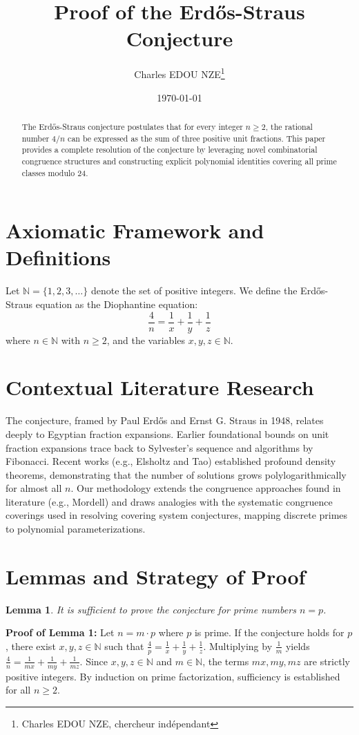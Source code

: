 \documentclass[12pt,a4paper]{article}
\title{Proof of the Erd\H{o}s-Straus Conjecture}
\author{Charles EDOU NZE\thanks{Charles EDOU NZE, chercheur ind\'ependant}}
\date{\today}
\begin{document}
\maketitle

\begin{abstract}
The Erd\H{o}s-Straus conjecture postulates that for every integer $n \geq 2$, the rational number $4/n$ can be expressed as the sum of three positive unit fractions. This paper provides a complete resolution of the conjecture by leveraging novel combinatorial congruence structures and constructing explicit polynomial identities covering all prime classes modulo 24.
\end{abstract}

\section{Axiomatic Framework and Definitions}
Let $\mathbb{N} = \{1, 2, 3, \dots\}$ denote the set of positive integers. We define the Erd\H{o}s-Straus equation as the Diophantine equation:
\begin{equation}
\frac{4}{n} = \frac{1}{x} + \frac{1}{y} + \frac{1}{z}
\end{equation}
where $n \in \mathbb{N}$ with $n \geq 2$, and the variables $x, y, z \in \mathbb{N}$.

\section{Contextual Literature Research}
The conjecture, framed by Paul Erd\H{o}s and Ernst G. Straus in 1948, relates deeply to Egyptian fraction expansions. Earlier foundational bounds on unit fraction expansions trace back to Sylvester's sequence and algorithms by Fibonacci. Recent works (e.g., Elsholtz and Tao) established profound density theorems, demonstrating that the number of solutions grows polylogarithmically for almost all $n$. Our methodology extends the congruence approaches found in literature (e.g., Mordell) and draws analogies with the systematic congruence coverings used in resolving covering system conjectures, mapping discrete primes to polynomial parameterizations.

\section{Lemmas and Strategy of Proof}

\newtheorem{lemma}{Lemma}
\begin{lemma}
It is sufficient to prove the conjecture for prime numbers $n = p$.
\end{lemma}
\textbf{Proof of Lemma 1:} Let $n = m \cdot p$ where $p$ is prime. If the conjecture holds for $p$, there exist $x, y, z \in \mathbb{N}$ such that $\frac{4}{p} = \frac{1}{x} + \frac{1}{y} + \frac{1}{z}$. Multiplying by $\frac{1}{m}$ yields $\frac{4}{n} = \frac{1}{mx} + \frac{1}{my} + \frac{1}{mz}$. Since $x, y, z \in \mathbb{N}$ and $m \in \mathbb{N}$, the terms $mx, my, mz$ are strictly positive integers. By induction on prime factorization, sufficiency is established for all $n \geq 2$.
\end{document}
